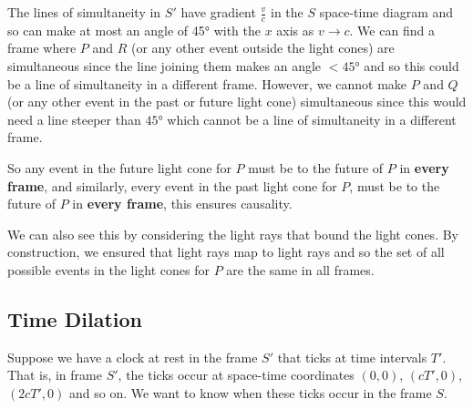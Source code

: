 \documentclass[../main.tex]{subfiles}
\begin{document}
The lines of simultaneity in $S'$ have gradient $\frac{v}{c}$ in the $S$ space-time diagram and so can make at most an angle of \ang{45} with the $x$ axis as $v \to c$.
We can find a frame where $P$ and $R$ (or any other event outside the light cones) are simultaneous since the line joining them makes an angle $<\ang{45}$ and so this could be a line of simultaneity in a different frame.
However, we cannot make $P$ and $Q$ (or any other event in the past or future light cone) simultaneous since this would need a line steeper than $\ang{45}$ which cannot be a line of simultaneity in a different frame.

So any event in the future light cone for $P$ must be to the future of $P$ in \textbf{every frame}, and similarly, every event in the past light cone for $P$, must be to the future of $P$ in \textbf{every frame}, this ensures causality.
\begin{remark}
  We can also see this by considering the light rays that bound the light cones.
  By construction, we ensured that light rays map to light rays and so the set of all possible events in the light cones for $P$ are the same in all frames.
\end{remark}
\subsection{Time Dilation}
Suppose we have a clock at rest in the frame $S'$ that ticks at time intervals $T'$.
That is, in frame $S'$, the ticks occur at space-time coordinates $(0, 0)$, $(cT', 0)$, $(2cT', 0)$ and so on.
We want to know when these ticks occur in the frame $S$.
\end{document}
